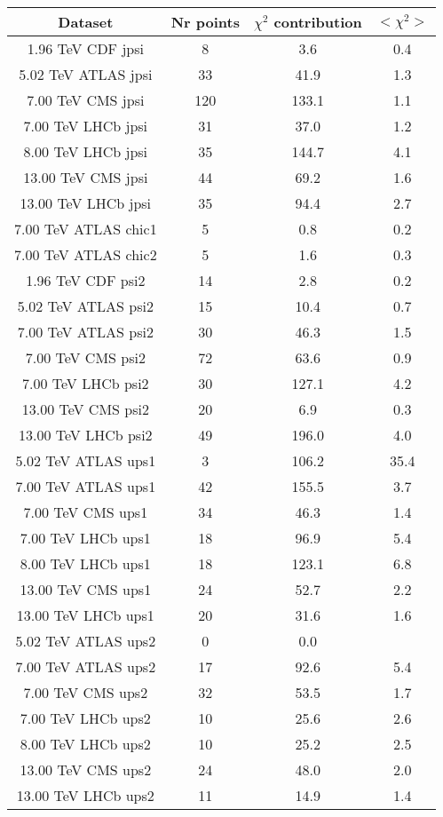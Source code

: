 \begin{table}[h!]
\centering
\begin{tabular}{c|c|c|c}
Dataset & Nr points & $\chi^2$ contribution & $<\chi^2>$ \\
\hline
1.96 TeV CDF jpsi & 8 & 3.6 & 0.4 \\
5.02 TeV ATLAS jpsi & 33 & 41.9 & 1.3 \\
7.00 TeV CMS jpsi & 120 & 133.1 & 1.1 \\
7.00 TeV LHCb jpsi & 31 & 37.0 & 1.2 \\
8.00 TeV LHCb jpsi & 35 & 144.7 & 4.1 \\
13.00 TeV CMS jpsi & 44 & 69.2 & 1.6 \\
13.00 TeV LHCb jpsi & 35 & 94.4 & 2.7 \\
7.00 TeV ATLAS chic1 & 5 & 0.8 & 0.2 \\
7.00 TeV ATLAS chic2 & 5 & 1.6 & 0.3 \\
1.96 TeV CDF psi2 & 14 & 2.8 & 0.2 \\
5.02 TeV ATLAS psi2 & 15 & 10.4 & 0.7 \\
7.00 TeV ATLAS psi2 & 30 & 46.3 & 1.5 \\
7.00 TeV CMS psi2 & 72 & 63.6 & 0.9 \\
7.00 TeV LHCb psi2 & 30 & 127.1 & 4.2 \\
13.00 TeV CMS psi2 & 20 & 6.9 & 0.3 \\
13.00 TeV LHCb psi2 & 49 & 196.0 & 4.0 \\
5.02 TeV ATLAS ups1 & 3 & 106.2 & 35.4 \\
7.00 TeV ATLAS ups1 & 42 & 155.5 & 3.7 \\
7.00 TeV CMS ups1 & 34 & 46.3 & 1.4 \\
7.00 TeV LHCb ups1 & 18 & 96.9 & 5.4 \\
8.00 TeV LHCb ups1 & 18 & 123.1 & 6.8 \\
13.00 TeV CMS ups1 & 24 & 52.7 & 2.2 \\
13.00 TeV LHCb ups1 & 20 & 31.6 & 1.6 \\
5.02 TeV ATLAS ups2 & 0 & 0.0 &  \\
7.00 TeV ATLAS ups2 & 17 & 92.6 & 5.4 \\
7.00 TeV CMS ups2 & 32 & 53.5 & 1.7 \\
7.00 TeV LHCb ups2 & 10 & 25.6 & 2.6 \\
8.00 TeV LHCb ups2 & 10 & 25.2 & 2.5 \\
13.00 TeV CMS ups2 & 24 & 48.0 & 2.0 \\
13.00 TeV LHCb ups2 & 11 & 14.9 & 1.4 \\

\end{tabular}
\end{table}
